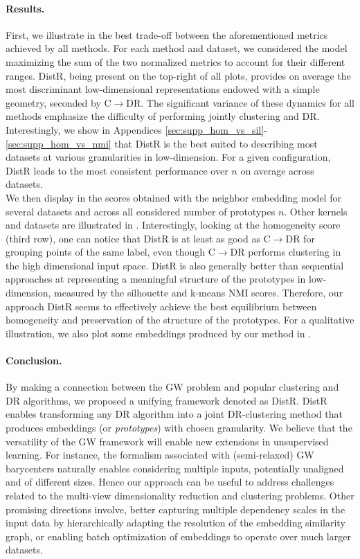 \paragraph{Results.} 
First, we illustrate in  the best trade-off between the aforementioned metrics achieved by all methods.  %
For each method and dataset, we considered the model maximizing the sum of the
two normalized metrics to account for their different ranges. DistR, being
present on the top-right of all plots, provides on average the most discriminant
low-dimensional representations endowed with a simple geometry, seconded by
C$\rightarrow$DR. The significant variance of these dynamics for all methods
emphasize the difficulty of performing jointly clustering and DR.
Interestingly, we show in Appendices
\ref{sec:supp_hom_vs_sil}-\ref{sec:supp_hom_vs_nmi} that DistR is the best
suited to describing most datasets at various granularities in low-dimension. %
For a given configuration, DistR leads to the most consistent performance over
$n$ on average across datasets.\\
We then display in   the scores obtained with the neighbor embedding model for several datasets and across all considered number of prototypes $n$. Other kernels and datasets are illustrated in %
. Interestingly, looking at the homogeneity score
(third row), one can notice that DistR is at least as good as C$\to$DR for
grouping points of the same label, even though C$\to$DR performs clustering in
the high dimensional input space. DistR is also generally better than sequential
approaches at representing a meaningful structure of the prototypes in
low-dimension, measured by the silhouette and k-means NMI scores. Therefore, our
approach DistR seems to effectively achieve the best equilibrium between
homogeneity and preservation of the structure of the prototypes. For a
qualitative illustration, we also plot some embeddings produced by our method in
.

\paragraph{Conclusion.}
By making a connection between the GW problem and popular clustering and DR
algorithms, we proposed a unifying framework denoted as DistR.
DistR enables transforming any DR algorithm into a joint DR-clustering method that produces embeddings (or \emph{prototypes}) with chosen granularity.
We believe that the versatility of the GW framework will enable new extensions in unsupervised learning.
For instance, the formalism associated with (semi-relaxed) GW barycenters naturally enables considering multiple inputs, potentially unaligned and of different sizes. Hence our approach can be useful to address challenges related to the multi-view dimensionality reduction and clustering problems. Other promising directions involve, better capturing multiple dependency scales in the input data by hierarchically adapting the resolution of the embedding similarity graph, or enabling batch optimization of embeddings to operate over much larger datasets.